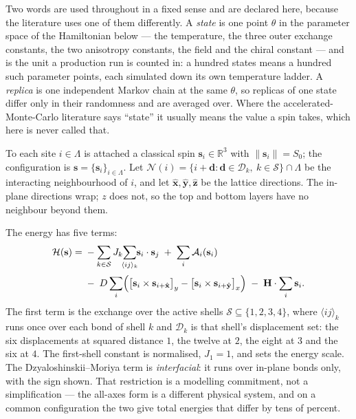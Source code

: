\documentclass[11pt,a4paper]{article}
\newcommand{\vs}{\mathbf{s}}
\newcommand{\vd}{\mathbf{d}}
\newcommand{\vH}{\mathbf{H}}
\newcommand{\Ham}{\mathcal{H}}
\newcommand{\shells}{\mathcal{S}}
\begin{document}
Two words are used throughout in a fixed sense and are declared here, because
the literature uses one of them differently. A \emph{state} is one point
$\theta$ in the parameter space of the Hamiltonian below --- the temperature,
the three outer exchange constants, the two anisotropy constants, the field and
the chiral constant --- and is the unit a production run is counted in: a
hundred states means a hundred such parameter points, each simulated down its
own temperature ladder. A \emph{replica} is one independent Markov chain at the
same $\theta$, so replicas of one state differ only in their randomness and are
averaged over. Where the accelerated-Monte-Carlo literature says ``state'' it
usually means the value a spin takes, which here is never called that.

To each site $i \in \Lambda$ is attached a classical spin
$\vs_i \in \mathbb{R}^3$ with $\lVert \vs_i \rVert = S_0$; the configuration is
$\vs = \{\vs_i\}_{i \in \Lambda}$. Let
$\mathcal{N}(i) = \{ i + \vd : \vd \in \mathcal{D}_k,\ k \in \shells \} \cap
\Lambda$ be the interacting neighbourhood of $i$, and let
$\hat{\mathbf{x}}, \hat{\mathbf{y}}, \hat{\mathbf{z}}$ be the lattice
directions. The in-plane directions wrap; $z$ does not, so the top and bottom
layers have no neighbour beyond them.

The energy has five terms:
%
\begin{equation}
\begin{aligned}
\Ham(\vs) ={}&
  -\sum_{k \in \shells} J_k \!\!\sum_{\langle i j \rangle_k}\!\!
     \vs_i \cdot \vs_j
  \;+\; \sum_{i} \mathcal{A}_i(\vs_i) \\[2pt]
  &-\; D \sum_{i} \Bigl(
       \bigl[ \vs_i \times \vs_{i+\hat{\mathbf{x}}} \bigr]_{y}
     - \bigl[ \vs_i \times \vs_{i+\hat{\mathbf{y}}} \bigr]_{x} \Bigr)
  \;-\; \vH \cdot \sum_i \vs_i .
\end{aligned}
\label{eq:hamiltonian}
\end{equation}
%
The first term is the exchange over the active shells
$\shells \subseteq \{1,2,3,4\}$, where $\langle i j \rangle_k$ runs once over
each bond of shell $k$ and $\mathcal{D}_k$ is that shell's displacement set: the
six displacements at squared distance $1$, the twelve at $2$, the eight at $3$
and the six at $4$. The first-shell constant is normalised, $J_1 = 1$, and sets
the energy scale. The Dzyaloshinskii--Moriya term is \emph{interfacial}: it runs
over in-plane bonds only, with the sign shown. That restriction is a modelling
commitment, not a simplification --- the all-axes form is a different physical
system, and on a common configuration the two give total energies that differ by
tens of percent.
\end{document}
